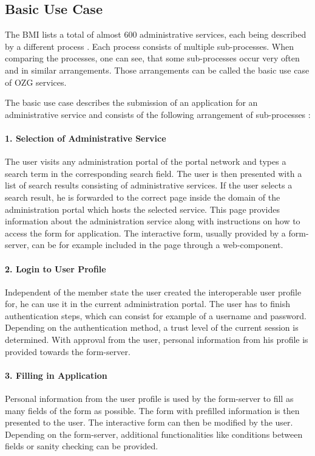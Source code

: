 \documentclass[
     12pt,         %
     a4paper,      %
     BCOR=10mm,version=first,     %
     DIV=14,version=first,        %
     ]{scrreprt}
\begin{document}
\subsection{Basic Use Case}
The BMI lists a total of almost 600 administrative services, each being described by a different process \cite{BMI:Informatiosplattform}. Each process consists of multiple sub-processes. When comparing the processes, one can see, that some sub-processes occur very often and in similar arrangements. Those arrangements can be called the basic use case of OZG services.

The basic use case describes the submission of an application for an administrative service and consists of the following arrangement of sub-processes \cite{NRW:Umsetzung}:

\paragraph{1. Selection of Administrative Service}
The user visits any administration portal of the portal network and types a search term in the corresponding search field. The user is then presented with a list of search results consisting of administrative services. If the user selects a search result, he is forwarded to the correct page inside the domain of the administration portal which hosts the selected service. This page provides information about the administration service along with instructions on how to access the form for application. The interactive form, usually provided by a form-server, can be for example included in the page through a web-component.

\paragraph{2. Login to User Profile}
Independent of the member state the user created the interoperable user profile for, he can use it in the current administration portal. The user has to finish authentication steps, which can consist for example of a username and password. Depending on the authentication method, a trust level of the current session is determined. With approval from the user, personal information from his profile is provided towards the form-server.

\paragraph{3. Filling in Application}
Personal information from the user profile is used by the form-server to fill as many fields of the form as possible. The form with prefilled information is then presented to the user. The interactive form can then be modified by the user. Depending on the form-server, additional functionalities like conditions between fields or sanity checking can be provided.
\end{document}
